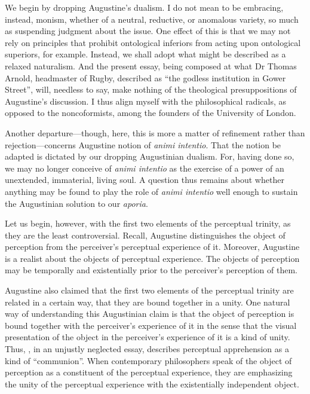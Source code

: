 \documentclass[12pt]{article}
\begin{document}
We begin by dropping Augustine's dualism. I do not mean to be embracing, instead, monism, whether of a neutral, reductive, or anomalous variety, so much as suspending judgment about the issue. One effect of this is that we may not rely on principles that prohibit ontological inferiors from acting upon ontological superiors, for example. Instead, we shall adopt what might be described as a relaxed naturalism. And the present essay, being composed at what Dr Thomas Arnold, headmaster of Rugby, described as ``the godless institution in Gower Street'', will, needless to say, make nothing of the theological presuppositions of Augustine's discussion. I thus align myself with the philosophical radicals, as opposed to the noncoformists, among the founders of the University of London.

Another departure---though, here, this is more a matter of refinement rather than rejection---concerns Augustine notion of \emph{animi intentio}. That the notion be adapted is dictated by our dropping Augustinian dualism. For, having done so, we may no longer conceive of \emph{animi intentio} as the exercise of a power of an unextended, immaterial, living soul. A question thus remains about whether anything may be found to play the role of \emph{animi intentio} well enough to sustain the Augustinian solution to our \emph{aporia}.

Let us begin, however, with the first two elements of the perceptual trinity, as they are the least controversial. Recall, Augustine distinguishes the object of perception from the perceiver's perceptual experience of it. Moreover, Augustine is a realist about the objects of perceptual experience. The objects of perception may be temporally and existentially prior to the perceiver's perception of them. 

Augustine also claimed that the first two elements of the perceptual trinity are related in a certain way, that they are bound together in a unity. One natural way of understanding this Augustinian claim is that the object of perception is bound together with the perceiver's experience of it in the sense that the visual presentation of the object in the perceiver's experience of it is a kind of unity. Thus, \citet{Ardley:1958aa}, in an unjustly neglected essay, describes perceptual apprehension as a kind of ``communion''. When contemporary philosophers speak of the object of perception as a constituent of the perceptual experience, they are emphasizing the unity of the perceptual experience with the existentially independent object. 
\end{document}
